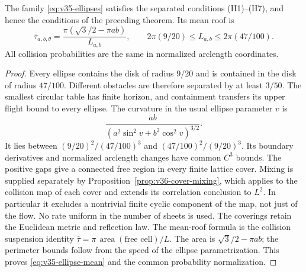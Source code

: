 \begin{lemma}
\label{lem:v35-ellipse-geometry}
The family \eqref{eq:v35-ellipses} satisfies the separated conditions
\textup{(H1)--(H7)}, and hence the conditions of the preceding theorem. Its mean roof is
\begin{equation}\label{eq:v35-ellipse-mean}
 \bar\tau_{a,b,\theta}
       =\frac{\pi(\sqrt3/2-\pi ab)}{L_{a,b}},\qquad
 2\pi(9/20)\le L_{a,b}\le2\pi(47/100).
\end{equation}
All collision probabilities are the same in normalized arclength
coordinates.
\end{lemma}
\begin{proof}
Every ellipse contains the disk of radius $9/20$ and is contained in
the disk of radius $47/100$. Different obstacles are therefore
separated by at least $3/50$. The smallest circular table has finite
horizon, and containment transfers its upper flight bound to every
ellipse. The curvature in the usual ellipse parameter $v$ is
\[
 \frac{ab}{(a^2\sin^2v+b^2\cos^2v)^{3/2}}.
\]
It lies between $(9/20)^2/(47/100)^3$ and
$(47/100)^2/(9/20)^3$. Its boundary derivatives and normalized
arclength changes have common $C^3$ bounds. The positive gaps give a connected free region in every finite
lattice cover. Mixing is supplied separately by
Proposition~\ref{prop:v36-cover-mixing}, which applies
\cite[Section 8.1, Theorem 6(b)]{Young} to the collision map of each
cover and extends its correlation conclusion to $L^2$. In particular
it excludes a nontrivial finite cyclic component of the map, not just
of the flow. No rate uniform in the number of sheets is used.
The coverings retain the Euclidean metric and reflection law. The mean-roof
formula is the collision suspension identity
$\bar\tau=\pi\,\operatorname{area}(\text{free cell})/L$.
The area is $\sqrt3/2-\pi ab$; the perimeter bounds follow from the
speed of the ellipse parametrization. This proves
\eqref{eq:v35-ellipse-mean} and the common probability normalization.


\end{proof}
